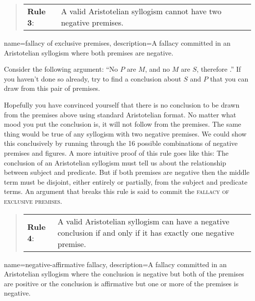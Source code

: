 \begin{quotation}
\begin{tabu}{p{.1\linewidth}p{.9\linewidth}}
\textbf{Rule 3}: & A valid Aristotelian syllogism cannot have two negative premises.
\end{tabu}\label{rule_3}
\end{quotation}

{
name=fallacy of exclusive premises,
description={A fallacy committed in an Aristotelian syllogism where both premises are negative.}
}

Consider the following argument: ``No $P$ are $M$, and no $M$ are $S$, therefore \underline{\hspace{2cm}}.'' If you haven't done so already, try to find a conclusion about $S$ and $P$ that you can draw from this pair of premises.

Hopefully you have convinced yourself that there is no conclusion to be drawn  from the premises above using standard Aristotelian format. No matter what mood you put the conclusion is, it will not follow from the premises. The same thing would be true of any syllogism with two negative premises. We could show this conclusively by running through the 16 possible combinations of negative premises and figures. A more intuitive proof of this rule goes like this: The conclusion of an Aristotelian syllogism must tell us about the relationship between subject and predicate. But if both premises are negative then the middle term must be disjoint, either entirely or partially, from the subject and predicate terms. An argument that breaks this rule is said to commit the \textsc{\gls{fallacy of exclusive premises}}. \label{def:exclusive_premises}


\begin{quotation}
\begin{tabu}{p{.1\linewidth}p{.9\linewidth}}
\textbf{Rule 4}: & A valid Aristotelian syllogism can have a negative conclusion if and only if it has exactly one negative premise.
\end{tabu} \label{rule_4}
\end{quotation}
\label{rule4}

{
name=negative-affirmative  fallacy,
description={A fallacy committed in an Aristotelian syllogism where the conclusion is negative but both of the premises are positive or the conclusion is affirmative but one or more of the premises is negative.}
}

